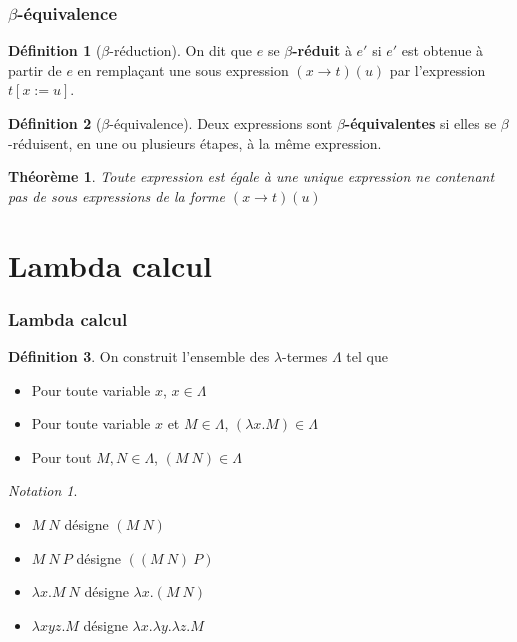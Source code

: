 \documentclass[11pt,a4paper]{beamer}
\theoremstyle{plain}
\newtheorem{thm}{Théorème}[section]
\theoremstyle{definition}
\newtheorem{defn}{Définition}[section]
\theoremstyle{remark}
\newtheorem*{notation}{Notation}
\begin{document}
\begin{frame}
\frametitle{$\beta$-équivalence}
\begin{defn}[$\beta$-réduction]
On dit que $e$ se \textbf{$\beta$-réduit} à $e'$ si $e'$ est obtenue à partir de $e$ en remplaçant une sous expression $(x\rightarrow t)(u)$ par l'expression $t[x:=u]$.
\end{defn}

\begin{defn}[$\beta$-équivalence]
Deux expressions sont \textbf{$\beta$-équivalentes} si elles se $\beta$-réduisent, en une ou plusieurs étapes, à la même expression.
\end{defn}

\begin{thm}
Toute expression est égale à une unique expression ne contenant pas de sous expressions de la forme $(x\rightarrow t)(u)$
\end{thm}
\end{frame}

\section{Lambda calcul}
\begin{frame}
\frametitle{Lambda calcul}
\begin{defn}
On construit l'ensemble des $\lambda$-termes $\Lambda$ tel que
\begin{itemize}
\item Pour toute variable $x$, $x\in\Lambda$
\item Pour toute variable $x$ et $M\in\Lambda$, $(\lambda x.M)\in\Lambda$
\item Pour tout $M,N\in\Lambda$, $(M~N)\in\Lambda$
\end{itemize}
\end{defn}

\begin{notation}
\begin{itemize}
\item $M~N$ désigne $(M~N)$
\item $M~N~P$ désigne $((M~N)~P)$
\item $\lambda x.M~N$ désigne $\lambda x.(M~N)$
\item $\lambda xyz.M$ désigne $\lambda x.\lambda y. \lambda z. M$
\end{itemize}
\end{notation}
\end{frame}
\end{document}
